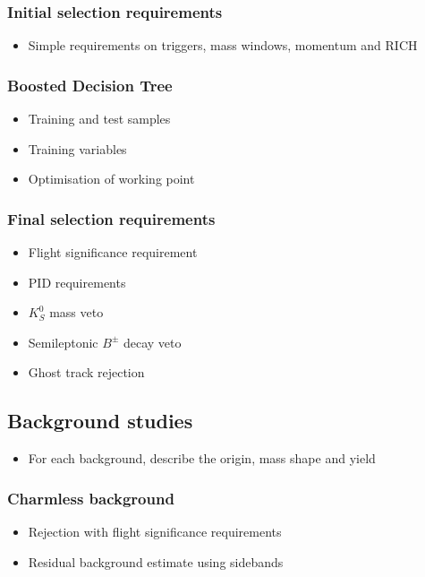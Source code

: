 \documentclass[12pt, a4paper, notitlepage, onecolumn]{article}
\begin{document}
\subsubsection{Initial selection requirements}
  \begin{itemize}[nosep]
    \setlength{\itemindent}{2.5em}
    \item[\textasteriskcentered]{Simple requirements on triggers, mass windows, momentum and RICH}
  \end{itemize}
\subsubsection{Boosted Decision Tree}
  \begin{itemize}[nosep]
    \setlength{\itemindent}{2.5em}
    \item[\textasteriskcentered]{Training and test samples}
    \item[\textasteriskcentered]{Training variables}
    \item[\textasteriskcentered]{Optimisation of working point}
  \end{itemize}
\subsubsection{Final selection requirements}
  \begin{itemize}[nosep]
    \setlength{\itemindent}{2.5em}
    \item[\textasteriskcentered]{Flight significance requirement}
    \item[\textasteriskcentered]{PID requirements}
    \item[\textasteriskcentered]{$K^0_S$ mass veto}
    \item[\textasteriskcentered]{Semileptonic $B^\pm$ decay veto}
    \item[\textasteriskcentered]{Ghost track rejection}
  \end{itemize}
\subsection{Background studies}
  \begin{itemize}[nosep]
    \setlength{\itemindent}{2em}
    \item[\textendash]{For each background, describe the origin, mass shape and yield}
  \end{itemize}
\subsubsection{Charmless background}
  \begin{itemize}[nosep]
    \setlength{\itemindent}{2.5em}
    \item[\textasteriskcentered]{Rejection with flight significance requirements}
    \item[\textasteriskcentered]{Residual background estimate using sidebands}
  \end{itemize}
\end{document}
